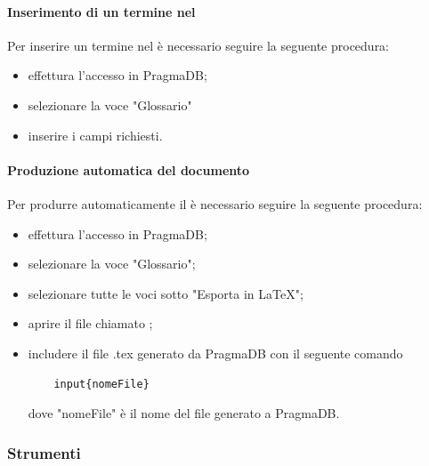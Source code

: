 \paragraph{Inserimento di un termine nel \Gldoc}
Per inserire un termine nel \Gldoc è necessario seguire la seguente procedura:
\begin{itemize}
	\item effettura l'accesso in PragmaDB;
	\item selezionare la voce "Glossario"
	\item inserire i campi richiesti.
\end{itemize}
\paragraph{Produzione automatica del documento \Gldoc}
Per produrre automaticamente il \Gldoc è necessario seguire la seguente procedura:
\begin{itemize}
	\item effettura l'accesso in PragmaDB;
	\item selezionare la voce "Glossario";
	\item selezionare tutte le voci sotto "Esporta in \LaTeX";
	\item aprire il file chiamato \Glfile;
	\item includere il file .tex generato da PragmaDB con il seguente comando
	\begin{verbatim}
	input{nomeFile}
	\end{verbatim}
	dove "nomeFile" è il nome del file generato a PragmaDB.
\end{itemize}
\subsubsection{Strumenti}
\label{sec:Strumenti}

